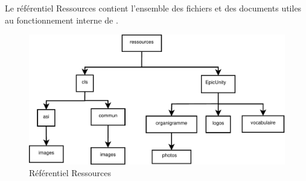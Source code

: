 
Le référentiel Ressources contient l'ensemble des fichiers et des documents utiles au fonctionnement interne de \nomEquipe{}.

\begin{figure}[ht]
         \begin{center}
         \includegraphics[scale=0.78]{images/arboRessources}
         \end{center}
         \caption{Référentiel Ressources}
 \end{figure}
